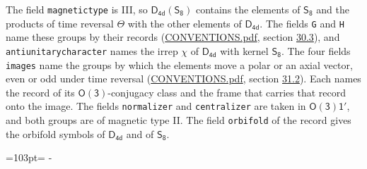\documentclass[10pt,a4paper]{article}
\newcommand{\needspace}[1]{\par\penalty-100\begingroup\dimen0=#1\relax\dimen2=\pagegoal
  \advance\dimen2-\pagetotal\ifdim\dimen0>\dimen2\relax\ifdim\dimen2>0pt\vfil\break\fi\fi
  \endgroup}
\numberwithin{equation}{section}
\newcommand{\grp}[1]{\mathsf{#1}}
\begin{document}
The field \texttt{magnetictype} is III, so $\grp{D_{4d}}(\grp{S_{8}})$ contains the elements of $\grp{S_{8}}$ and the products of time reversal $\varTheta$ with the other elements of $\grp{D_{4d}}$. The fields \texttt{G} and \texttt{H} name these groups by their records (\href{../../CONVENTIONS.pdf}{CONVENTIONS.pdf}, section \href{../../CONVENTIONS.pdf\#conv.30.3}{30.3}), and \texttt{antiunitarycharacter} names the irrep $\chi$ of $\grp{D_{4d}}$ with kernel $\grp{S_{8}}$. The four fields \texttt{images} name the groups by which the elements move a polar or an axial vector, even or odd under time reversal (\href{../../CONVENTIONS.pdf}{CONVENTIONS.pdf}, section \href{../../CONVENTIONS.pdf\#conv.31.2}{31.2}). Each names the record of its $\grp{O(3)}$-conjugacy class and the frame that carries that record onto the image. The fields \texttt{normalizer} and \texttt{centralizer} are taken in $\grp{O(3)1'}$, and both groups are of magnetic type II. The field \texttt{orbifold} of the record gives the orbifold symbols of $\grp{D_{4d}}$ and of $\grp{S_{8}}$.
\needspace{103pt}
\end{document}
